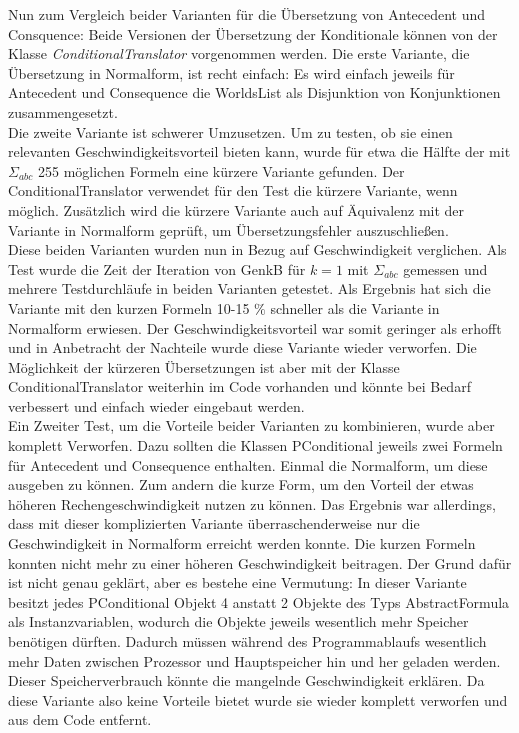 \documentclass[12pt,a4paper]{article}
\begin{document}
Nun zum Vergleich beider Varianten für die Übersetzung von Antecedent und Consquence: Beide  Versionen der Übersetzung der Konditionale können von der Klasse \textit{ConditionalTranslator} vorgenommen werden. Die erste Variante, die Übersetzung in Normalform, ist recht einfach: Es wird einfach jeweils für Antecedent und Consequence die WorldsList als Disjunktion von Konjunktionen zusammengesetzt. \\
Die zweite Variante ist schwerer Umzusetzen. Um zu testen, ob sie einen relevanten Geschwindigkeitsvorteil bieten kann, wurde für etwa die Hälfte der mit $\Sigma_{abc}$ 255 möglichen Formeln eine kürzere Variante gefunden. Der ConditionalTranslator verwendet für den Test die kürzere Variante, wenn möglich. Zusätzlich wird die kürzere Variante auch auf Äquivalenz mit der Variante in Normalform geprüft, um Übersetzungsfehler auszuschließen. \\
Diese beiden Varianten wurden nun in Bezug auf Geschwindigkeit verglichen. Als Test wurde die Zeit der Iteration von GenkB für $k=1$ mit $\Sigma_{abc}$ gemessen und mehrere Testdurchläufe in beiden Varianten getestet. Als Ergebnis hat sich die Variante mit den kurzen Formeln 10-15 $\%$ schneller als die Variante in Normalform erwiesen. Der Geschwindigkeitsvorteil war somit geringer als erhofft und in Anbetracht der Nachteile wurde diese Variante wieder verworfen. Die Möglichkeit der kürzeren Übersetzungen ist aber mit der Klasse ConditionalTranslator weiterhin im Code vorhanden und könnte bei Bedarf verbessert und einfach wieder eingebaut werden. \\
Ein Zweiter Test, um die Vorteile beider Varianten zu kombinieren, wurde aber komplett Verworfen. Dazu sollten die Klassen PConditional jeweils zwei Formeln für Antecedent und Consequence enthalten. Einmal die Normalform, um diese ausgeben zu können. Zum andern die kurze Form, um den Vorteil der etwas höheren Rechengeschwindigkeit nutzen zu können. Das Ergebnis war allerdings, dass mit dieser komplizierten Variante überraschenderweise nur die Geschwindigkeit in Normalform erreicht werden konnte. Die kurzen Formeln konnten nicht mehr zu einer höheren Geschwindigkeit beitragen. Der Grund dafür ist nicht genau geklärt, aber es bestehe eine Vermutung: In dieser Variante besitzt jedes PConditional Objekt 4 anstatt 2 Objekte des Typs AbstractFormula als Instanzvariablen, wodurch die Objekte jeweils wesentlich mehr Speicher benötigen dürften. Dadurch müssen während des Programmablaufs wesentlich mehr Daten zwischen Prozessor und Hauptspeicher hin und her geladen werden. Dieser Speicherverbrauch könnte die mangelnde Geschwindigkeit erklären. Da diese Variante also keine Vorteile bietet wurde sie wieder komplett verworfen und aus dem Code entfernt.
\end{document}
